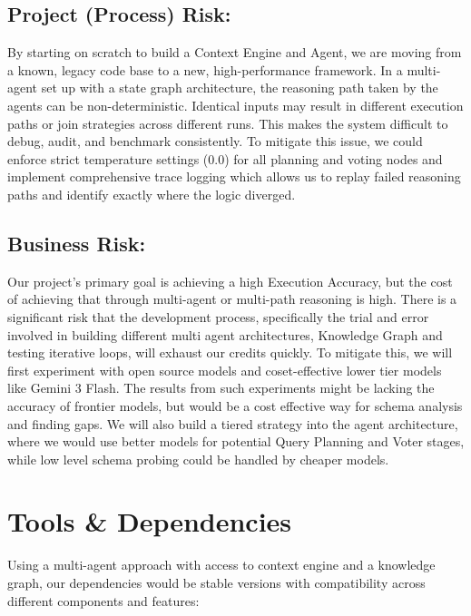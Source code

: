 \subsection{Project (Process) Risk:}
By starting on scratch to build a Context Engine and Agent, we are moving from a known, legacy code base to a new, high-performance framework. In a multi-agent set up with a state graph architecture, the reasoning path taken by the agents can be non-deterministic. Identical inputs may result in different execution paths or join strategies across different runs. This makes the system difficult to debug, audit, and benchmark consistently. To mitigate this issue, we could enforce strict temperature settings (0.0) for all planning and voting nodes and implement comprehensive trace logging which allows us to replay failed reasoning paths and identify exactly where the logic diverged.

\subsection{Business Risk:}
Our project's primary goal is achieving a high Execution Accuracy, but the cost of achieving that through multi-agent or multi-path reasoning is high. There is a significant risk that the development process, specifically the trial and error involved in building different multi agent architectures, Knowledge Graph and testing iterative loops, will exhaust our credits quickly. To mitigate this, we will first experiment with open source models and coset-effective lower tier models like Gemini 3 Flash. The results from such experiments might be lacking the accuracy of frontier models, but would be a cost effective way for schema analysis and finding gaps. We will also build a tiered strategy into the agent architecture, where we would use better models for potential Query Planning and Voter stages, while low level schema probing could be handled by cheaper models. 

\section{Tools \& Dependencies}

Using a multi-agent approach with access to context engine and a knowledge graph, our dependencies would be stable versions with compatibility across different components and features:
